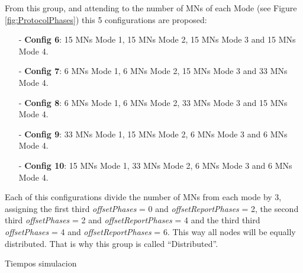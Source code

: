 \begin{itemize}
From this group, and attending to the number of \acp{MN} of each Mode (see Figure \ref{fig:ProtocolPhases}) this 5 configurations are proposed:
\begin{itemize}
 \item[-] \textbf{Config 6}: 15 \acp{MN} Mode 1, 15 \acp{MN} Mode 2, 15 \acp{MN} Mode 3 and 15 \acp{MN} Mode 4.
 \item[-] \textbf{Config 7}: 6 \acp{MN} Mode 1, 6 \acp{MN} Mode 2, 15 \acp{MN} Mode 3 and 33 \acp{MN} Mode 4.
 \item[-] \textbf{Config 8}: 6 \acp{MN} Mode 1, 6 \acp{MN} Mode 2, 33 \acp{MN} Mode 3 and 15 \acp{MN} Mode 4.
 \item[-] \textbf{Config 9}: 33 \acp{MN} Mode 1, 15 \acp{MN} Mode 2, 6 \acp{MN} Mode 3 and 6 \acp{MN} Mode 4.
 \item[-] \textbf{Config 10}: 15 \acp{MN} Mode 1, 33 \acp{MN} Mode 2, 6 \acp{MN} Mode 3 and 6 \acp{MN} Mode 4.
\end{itemize}
Each of this configurations divide the number of \acp{MN} from each mode by 3, assigning the first third \textit{offsetPhases} = 0 and 
\textit{offsetReportPhases} = 2, the second third \textit{offsetPhases} = 2 and \textit{offsetReportPhases} = 4 and the third third
\textit{offsetPhases} = 4 and \textit{offsetReportPhases} = 6. This way all nodes will be equally distributed. That is why this group is called
``Distributed''. 
\end{itemize}








Tiempos simulacion

